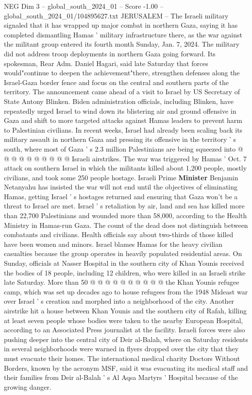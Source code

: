 \begin{textsample}{NEG Dim 3 – global\_south\_2024\_01 – Score -1.00 – global\_south\_2024\_01/104895627.txt}  \label{ex:f3_neg_080}
JERUSALEM -- The Israeli military signaled that it has wrapped up major combat in northern Gaza, saying it has completed dismantling Hamas ' military infrastructure there, as the war against the militant group entered its fourth month Sunday, Jan. 7, 2024.
The military did not address troop deployments in northern Gaza going forward.
Its spokesman, Rear Adm.
Daniel Hagari, said late Saturday that forces would"continue to deepen the achievement"there, strengthen defenses along the Israel-Gaza border fence and focus on the central and southern parts of the territory.
The announcement came ahead of a visit to Israel by US Secretary of State Antony Blinken.
Biden administration officials, including Blinken, have repeatedly urged Israel to wind down its blistering air and ground offensive in Gaza and shift to more targeted attacks against Hamas leaders to prevent harm to Palestinian civilians.
In recent weeks, Israel had already been scaling back its military assault in northern Gaza and pressing its offensive in the territory ' s south, where most of Gaza ' s 2.3 million Palestinians are being squeezed into @ @ @ @ @ @ @ @ @ @ Israeli airstrikes.
The war was triggered by Hamas ' Oct. 7 attack on southern Israel in which the militants killed about 1,200 people, mostly civilians, and took some 250 people hostage.
Israeli Prime \textbf{Minister} Benjamin Netanyahu has insisted the war will not end until the objectives of eliminating Hamas, getting Israel ' s hostages returned and ensuring that Gaza won't be a threat to Israel are met.
Israel ' s retaliation by air, land and sea has killed more than 22,700 Palestinians and wounded more than 58,000, according to the Health Ministry in Hamas-run Gaza.
The count of the dead does not distinguish between combatants and civilians.
Health officials say about two-thirds of those killed have been women and minors.
Israel blames Hamas for the heavy civilian casualties because the group operates in heavily populated residential areas.
On Sunday, officials at Nasser Hospital in the southern city of Khan Younis received the bodies of 18 people, including 12 children, who were killed in an Israeli strike late Saturday.
More than 50 @ @ @ @ @ @ @ @ @ @ the Khan Younis refugee camp, which was set up decades ago to house refugees from the 1948 Mideast war over Israel ' s creation and morphed into a neighborhood of the city.
Another airstrike hit a house between Khan Younis and the southern city of Rafah, killing at least seven people whose bodies were taken to the nearby European Hospital, according to an Associated Press journalist at the facility.
Israeli forces were also pushing deeper into the central city of Deir al-Balah, where on Saturday residents in several neighborhoods were warned in flyers dropped over the city that they must evacuate their homes.
The international medical charity Doctors Without Borders, known by the acronym MSF, said it was evacuating its medical staff and their families from Deir al-Balah ' s Al Aqsa Martyrs ' Hospital because of the growing danger.

\end{textsample}

